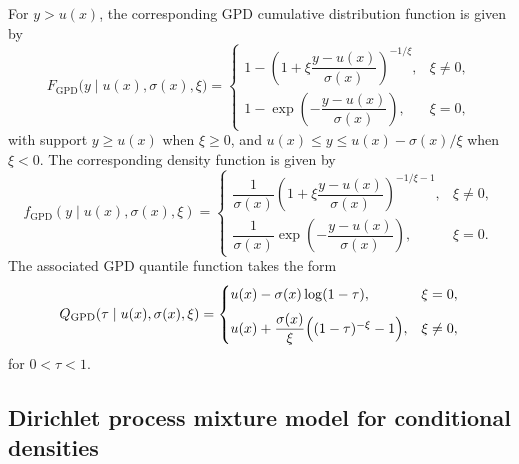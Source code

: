 \documentclass[preprint,12pt,authoryear]{elsarticle}
\begin{document}
For $y>u(x)$, the corresponding GPD cumulative distribution function is given by
\begin{equation*}
F_{\mathrm{GPD}}\bigl(y\mid u(x),\sigma(x),\xi\bigr)=
\begin{cases}
1-\left(1+\xi\dfrac{y-u(x)}{\sigma(x)}\right)^{-1/\xi}, & \xi\neq 0,\\[8pt]
1-\exp\!\left(-\dfrac{y-u(x)}{\sigma(x)}\right), & \xi=0,
\end{cases}
\end{equation*}
with support $y\ge u(x)$ when $\xi\ge 0$, and $u(x)\le y\le
u(x)-\sigma(x)/\xi$ when $\xi<0$.  The corresponding density function
is given by
\begin{equation*}
f_{\mathrm{GPD}}(y\mid u(x),\sigma(x),\xi)=
\begin{cases}
\dfrac{1}{\sigma(x)}\left(1+\xi\dfrac{y-u(x)}{\sigma(x)}\right)^{-1/\xi-1}, & \xi\neq 0,\\[10pt]
\dfrac{1}{\sigma(x)}\exp\!\left(-\dfrac{y-u(x)}{\sigma(x)}\right), & \xi=0.
\end{cases}
\end{equation*}
The associated GPD quantile function takes the form
\begin{equation*}
Q_{\mathrm{GPD}}(\tau\mid u(x),\sigma(x),\xi)=
\begin{cases}
u(x)-\sigma(x)\log(1-\tau), & \xi=0,\\[6pt]
u(x)+\dfrac{\sigma(x)}{\xi}\Bigl((1-\tau)^{-\xi}-1\Bigr), & \xi\neq 0,
\end{cases}
\end{equation*}
for $0<\tau<1$.





\subsection{Dirichlet process mixture model for conditional densities}
\label{subsec:dpm}
\end{document}

